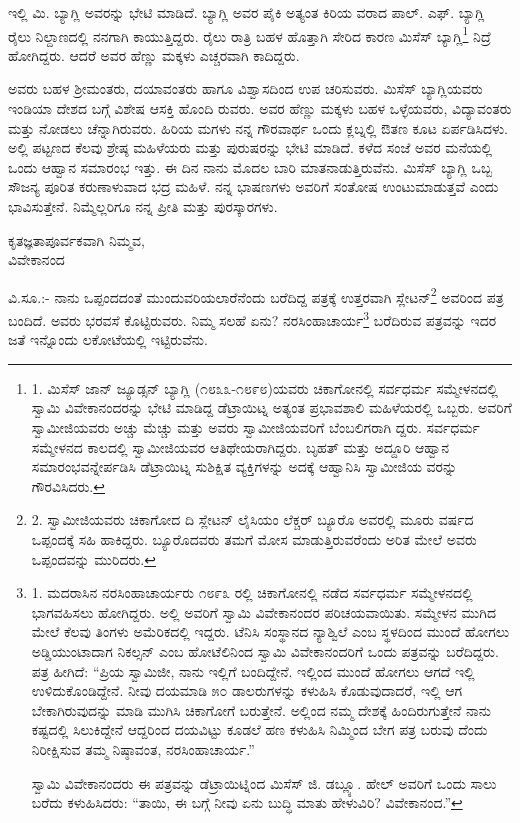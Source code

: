 ಇಲ್ಲಿ ಮಿ. ಬ್ಯಾಗ್ಲಿ ಅವರನ್ನು ಭೇಟಿ ಮಾಡಿದೆ. ಬ್ಯಾಗ್ಲಿ ಅವರ ಪೈಕಿ ಅತ್ಯಂತ ಕಿರಿಯ ವರಾದ ಪಾಲ್. ಎಫ್. ಬ್ಯಾಗ್ಲಿ ರೈಲು ನಿಲ್ದಾಣದಲ್ಲಿ ನನಗಾಗಿ ಕಾಯುತ್ತಿದ್ದರು. ರೈಲು ರಾತ್ರಿ ಬಹಳ ಹೊತ್ತಾಗಿ ಸೇರಿದ ಕಾರಣ ಮಿಸೆಸ್ ಬ್ಯಾಗ್ಲಿ\footnote{1. ಮಿಸೆಸ್ ಜಾನ್ ಜ್ಯೂಡ್ಸನ್ ಬ್ಯಾಗ್ಲಿ (೧೮೩೩-೧೮೯೮)ಯವರು ಚಿಕಾಗೋನಲ್ಲಿ ಸರ್ವಧರ್ಮ ಸಮ್ಮೇಳನದಲ್ಲಿ ಸ್ವಾಮಿ ವಿವೇಕಾನಂದರನ್ನು ಭೇಟಿ ಮಾಡಿದ್ದ ಡೆಟ್ರಾಯಿಟ್ನ ಅತ್ಯಂತ ಪ್ರಭಾವಶಾಲಿ ಮಹಿಳೆಯರಲ್ಲಿ ಒಬ್ಬರು. ಅವರಿಗೆ ಸ್ವಾಮೀಜಿಯವರು ಅಚ್ಚು ಮೆಚ್ಚು ಮತ್ತು ಅವರು ಸ್ವಾಮೀಜಿಯವರಿಗೆ ಬೆಂಬಲಿಗರಾಗಿ ದ್ದರು. ಸರ್ವಧರ್ಮ ಸಮ್ಮೇಳನದ ಕಾಲದಲ್ಲಿ ಸ್ವಾಮೀಜಿಯವರ ಆತಿಥೇಯರಾಗಿದ್ದರು. ಬೃಹತ್ ಮತ್ತು ಅದ್ದೂರಿ ಆಹ್ವಾನ ಸಮಾರಂಭವನ್ನೇರ್ಪಡಿಸಿ ಡೆಟ್ರಾಯಿಟ್ನ ಸುಶಿಕ್ಷಿತ ವ್ಯಕ್ತಿಗಳನ್ನು ಅದಕ್ಕೆ ಆಹ್ವಾನಿಸಿ ಸ್ವಾಮೀಜಿಯ ವರನ್ನು ಗೌರವಿಸಿದರು.} ನಿದ್ರೆ ಹೋಗಿದ್ದರು. ಆದರೆ ಅವರ ಹೆಣ್ಣು ಮಕ್ಕಳು ಎಚ್ಚರವಾಗಿ ಕಾದಿದ್ದರು.

ಅವರು ಬಹಳ ಶ‍್ರೀಮಂತರು, ದಯಾವಂತರು ಹಾಗೂ ವಿಶ್ವಾಸದಿಂದ ಉಪ ಚರಿಸುವರು. ಮಿಸೆಸ್ ಬ್ಯಾಗ್ಲಿಯವರು ಇಂಡಿಯಾ ದೇಶದ ಬಗ್ಗೆ ವಿಶೇಷ ಆಸಕ್ತಿ ಹೊಂದಿ ರುವರು. ಅವರ ಹೆಣ್ಣು ಮಕ್ಕಳು ಬಹಳ ಒಳ್ಳೆಯವರು, ವಿದ್ಯಾವಂತರು ಮತ್ತು ನೋಡಲು ಚೆನ್ನಾಗಿರುವರು. ಹಿರಿಯ ಮಗಳು ನನ್ನ ಗೌರವಾರ್ಥ ಒಂದು ಕ್ಲಬ್ನಲ್ಲಿ ಔತಣ ಕೂಟ ಏರ್ಪಡಿಸಿದಳು. ಅಲ್ಲಿ ಪಟ್ಟಣದ ಕೆಲವು ಶ್ರೇಷ್ಠ ಮಹಿಳೆಯರು ಮತ್ತು ಪುರುಷರನ್ನು ಭೇಟಿ ಮಾಡಿದೆ. ಕಳೆದ ಸಂಜೆ ಅವರ ಮನೆಯಲ್ಲಿ ಒಂದು ಆಹ್ವಾನ ಸಮಾರಂಭ ಇತ್ತು. ಈ ದಿನ ನಾನು ಮೊದಲ ಬಾರಿ ಮಾತನಾಡುತ್ತಿರುವೆನು. ಮಿಸೆಸ್ ಬ್ಯಾಗ್ಲಿ ಒಬ್ಬ ಸೌಜನ್ಯ ಪೂರಿತ ಕರುಣಾಳುವಾದ ಭದ್ರ ಮಹಿಳೆ. ನನ್ನ ಭಾಷಣಗಳು ಅವರಿಗೆ ಸಂತೋಷ ಉಂಟುಮಾಡುತ್ತವೆ ಎಂದು ಭಾವಿಸುತ್ತೇನೆ. ನಿಮ್ಮೆಲ್ಲರಿಗೂ ನನ್ನ ಪ್ರೀತಿ ಮತ್ತು ಪುರಸ್ಕಾರಗಳು.

\begin{flushright}
ಕೃತಜ್ಞತಾಪೂರ್ವಕವಾಗಿ ನಿಮ್ಮವ,\\ವಿವೇಕಾನಂದ
\end{flushright}

ವಿ.ಸೂ.:- ನಾನು ಒಪ್ಪಂದದಂತೆ ಮುಂದುವರಿಯಲಾರೆನೆಂದು ಬರೆದಿದ್ದ ಪತ್ರಕ್ಕೆ ಉತ್ತರವಾಗಿ ಸ್ಲೇಟನ್\footnote{2. ಸ್ವಾಮೀಜಿಯವರು ಚಿಕಾಗೋದ ದಿ ಸ್ಲೇಟನ್ ಲೈಸಿಯಂ ಲೆಕ್ಚರ್ ಬ್ಯೂರೊ ಅವರಲ್ಲಿ ಮೂರು ವರ್ಷದ ಒಪ್ಪಂದಕ್ಕೆ ಸಹಿ ಹಾಕಿದ್ದರು. ಬ್ಯೂರೊದವರು ತಮಗೆ ಮೋಸ ಮಾಡುತ್ತಿರುವರೆಂದು ಅರಿತ ಮೇಲೆ ಅವರು ಒಪ್ಪಂದವನ್ನು ಮುರಿದರು.} ಅವರಿಂದ ಪತ್ರ ಬಂದಿದೆ. ಅವರು ಭರವಸೆ ಕೊಟ್ಟಿರುವರು. ನಿಮ್ಮ ಸಲಹೆ ಏನು? ನರಸಿಂಹಾಚಾರ್ಯ\footnote{1. ಮದರಾಸಿನ ನರಸಿಂಹಾಚಾರ್ಯರು ೧೮೯೩ ರಲ್ಲಿ ಚಿಕಾಗೋನಲ್ಲಿ ನಡೆದ ಸರ್ವಧರ್ಮ ಸಮ್ಮೇಳನದಲ್ಲಿ ಭಾಗವಹಿಸಲು ಹೋಗಿದ್ದರು. ಅಲ್ಲಿ ಅವರಿಗೆ ಸ್ವಾಮಿ ವಿವೇಕಾನಂದರ ಪರಿಚಯವಾಯಿತು. ಸಮ್ಮೇಳನ ಮುಗಿದ ಮೇಲೆ ಕೆಲವು ತಿಂಗಳು ಅಮೆರಿಕದಲ್ಲಿ ಇದ್ದರು. ಟೆನಿಸಿ ಸಂಸ್ಥಾನದ ನ್ಯಾಶ್ವಿಲೆ ಎಂಬ ಸ್ಥಳದಿಂದ ಮುಂದೆ ಹೋಗಲು ಅಡ್ಡಿಯುಂಟಾದಾಗ ನಿಕಲ್ಸನ್ ಎಂಬ ಹೋಟೆಲಿನಿಂದ ಸ್ವಾಮಿ ವಿವೇಕಾನಂದರಿಗೆ ಒಂದು ಪತ್ರವನ್ನು ಬರೆದಿದ್ದರು. ಪತ್ರ ಹೀಗಿದೆ: “ಪ್ರಿಯ ಸ್ವಾಮಿಜೀ, ನಾನು ಇಲ್ಲಿಗೆ ಬಂದಿದ್ದೇನೆ. ಇಲ್ಲಿಂದ ಮುಂದೆ ಹೋಗಲು ಆಗದೆ ಇಲ್ಲಿ ಉಳಿದುಕೊಂಡಿದ್ದೇನೆ. ನೀವು ದಯಮಾಡಿ ೫೦ ಡಾಲರುಗಳನ್ನು ಕಳುಹಿಸಿ ಕೊಡುವುದಾದರೆ, ಇಲ್ಲಿ ಆಗ ಬೇಕಾಗಿರುವುದನ್ನು ಮಾಡಿ ಮುಗಿಸಿ ಚಿಕಾಗೋಗೆ ಬರುತ್ತೇನೆ. ಅಲ್ಲಿಂದ ನಮ್ಮ ದೇಶಕ್ಕೆ ಹಿಂದಿರುಗುತ್ತೇನೆ ನಾನು ಕಷ್ಟದಲ್ಲಿ ಸಿಲುಕಿದ್ದೇನೆ ಆದ್ದರಿಂದ ದಯವಿಟ್ಟು ಕೂಡಲೆ ಹಣ ಕಳುಹಿಸಿ ನಿಮ್ಮಿಂದ ಬೇಗ ಪತ್ರ ಬರುವು ದೆಂದು ನಿರೀಕ್ಷಿಸುವ ತಮ್ಮ ನಿಷ್ಠಾವಂತ, ನರಸಿಂಹಾಚಾರ್ಯ.”

ಸ್ವಾಮಿ ವಿವೇಕಾನಂದರು ಈ ಪತ್ರವನ್ನು ಡೆಟ್ರಾಯಿಟ್ನಿಂದ ಮಿಸೆಸ್ ಜಿ. ಡಬ್ಲ್ಯೂ. ಹೇಲ್ ಅವರಿಗೆ ಒಂದು ಸಾಲು ಬರೆದು ಕಳುಹಿಸಿದರು: “ತಾಯಿ, ಈ ಬಗ್ಗೆ ನೀವು ಏನು ಬುದ್ಧಿ ಮಾತು ಹೇಳುವಿರಿ? ವಿವೇಕಾನಂದ.”} ಬರೆದಿರುವ ಪತ್ರವನ್ನು ಇದರ ಜತೆ ಇನ್ನೊಂದು ಲಕೋಟೆಯಲ್ಲಿ ಇಟ್ಟಿರುವೆನು.

